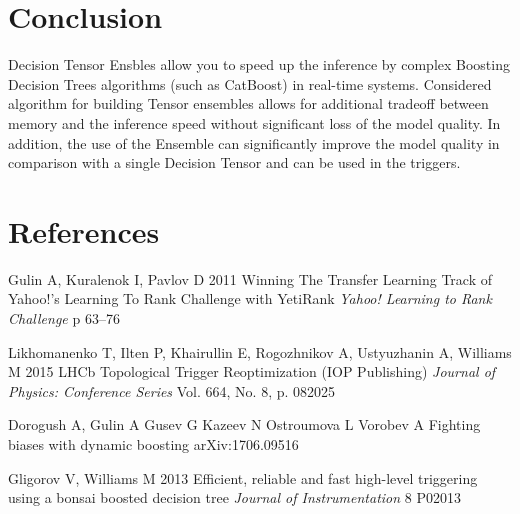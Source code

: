 \documentclass[a4paper]{jpconf}
\begin{document}
\section{Conclusion}

Decision Tensor Ensbles allow you to speed up the inference by complex Boosting Decision Trees algorithms (such as CatBoost) in real-time systems. Considered algorithm for building Tensor ensembles allows for additional tradeoff between memory and the inference speed without significant loss of the model quality.
In addition, the use of the Ensemble can significantly improve the model quality in comparison with a single Decision Tensor and can be used in the triggers.


\section*{References}
\item Gulin A, Kuralenok I, Pavlov D 2011 Winning The Transfer Learning Track of Yahoo!'s Learning To Rank Challenge with YetiRank {\it Yahoo! Learning to Rank Challenge} p 63--76
\item Likhomanenko T, Ilten P, Khairullin E, Rogozhnikov A, Ustyuzhanin A, Williams M 2015 LHCb Topological Trigger Reoptimization (IOP Publishing) {\it Journal of Physics: Conference Series} Vol. 664, No. 8, p. 082025
\item Dorogush A, Gulin A Gusev G Kazeev N Ostroumova L Vorobev A Fighting biases with dynamic boosting arXiv:1706.09516
\item Gligorov V, Williams M 2013 Efficient, reliable and fast high-level triggering using a bonsai boosted decision tree {\it Journal of Instrumentation} 8 P02013
\endnumrefs
\end{document}
